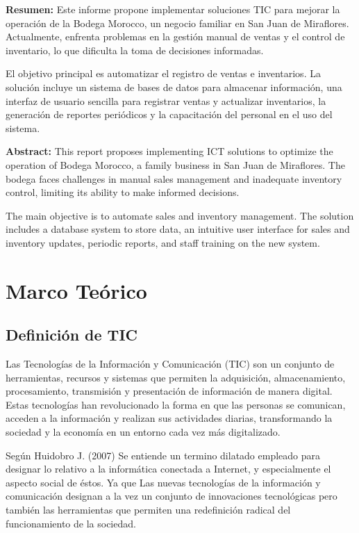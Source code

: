 \documentclass{article}
\begin{document}
  \begin{multicols}{2}
    \textbf{Resumen:} Este informe propone implementar soluciones TIC para mejorar la operación de la Bodega Morocco, un negocio familiar en San Juan de Miraflores. Actualmente, enfrenta problemas en la gestión manual de ventas y el control de inventario, lo que dificulta la toma de decisiones informadas.

    El objetivo principal es automatizar el registro de ventas e inventarios. La solución incluye un sistema de bases de datos para almacenar información, una interfaz de usuario sencilla para registrar ventas y actualizar inventarios, la generación de reportes periódicos y la capacitación del personal en el uso del sistema.

    \columnbreak

    \textbf{Abstract:} This report proposes implementing ICT solutions to optimize the operation of Bodega Morocco, a family business in San Juan de Miraflores. The bodega faces challenges in manual sales management and inadequate inventory control, limiting its ability to make informed decisions.

    The main objective is to automate sales and inventory management. The solution includes a database system to store data, an intuitive user interface for sales and inventory updates, periodic reports, and staff training on the new system.

\end{multicols}

\section{Marco Teórico}

  \subsection{Definición de TIC}

    Las Tecnologías de la Información y Comunicación (TIC) son un conjunto de herramientas, recursos y sistemas que permiten la adquisición, almacenamiento, procesamiento, transmisión y presentación de información de manera digital. Estas tecnologías han revolucionado la forma en que las personas se comunican, acceden a la información y realizan sus actividades diarias, transformando la sociedad y la economía en un entorno cada vez más digitalizado.

    Según Huidobro J. (2007) Se entiende un termino dilatado empleado para designar lo relativo a la informática conectada a Internet, y especialmente el aspecto social de éstos. Ya que Las nuevas tecnologías de la información y comunicación designan a la vez un conjunto de innovaciones tecnológicas pero también las herramientas que permiten una redefinición radical del funcionamiento de la sociedad.
\end{document}
